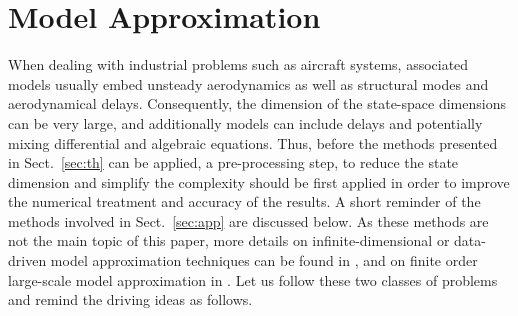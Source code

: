 \documentclass[graybox]{svmult}
\begin{document}
\section{Model Approximation}\label{sec:mr}\vspace{-1mm}
When dealing with industrial problems such as aircraft systems, associated models usually embed unsteady aerodynamics as well as structural modes and aerodynamical delays. Consequently, the dimension of the  state-space dimensions can be very large, and additionally models can include delays and potentially mixing differential and algebraic equations. Thus, before the methods presented in Sect.~\ref{sec:th} can be applied, a pre-processing step, to reduce the state dimension and simplify the complexity should be first applied in order to improve the numerical treatment and accuracy of the results. A short reminder of the methods involved in Sect.~\ref{sec:app} are discussed below. As these methods are not the main topic of this paper, more details on infinite-dimensional or data-driven model approximation techniques can be found in \cite{AntoulasSurvey:2016,DalmasECC:2016}, and on finite order large-scale model approximation in \cite{AntoulasBook:2005,GugercinSIAM:2008}.  Let us follow these two classes of problems and remind the driving ideas as follows.\vspace{-1mm}
\end{document}
